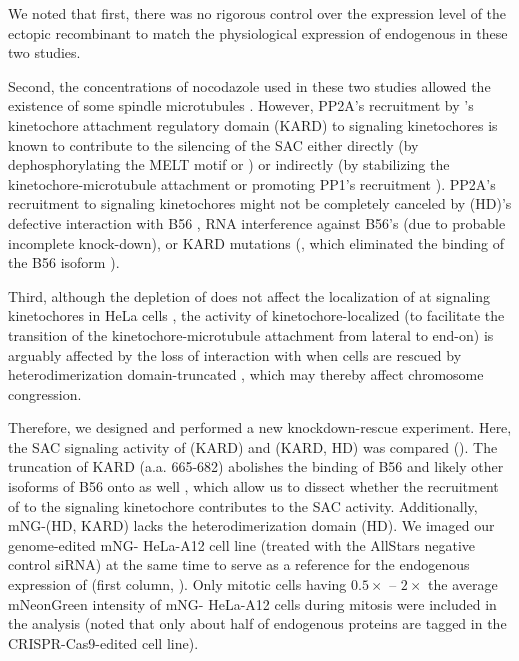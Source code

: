 We noted that first, there was no rigorous control over the expression level of the ectopic recombinant  to match the physiological expression of endogenous  in these two studies.

Second, the concentrations of nocodazole used in these two studies allowed the existence of some spindle microtubules \cite{100nMNoc}. However, PP2A's recruitment by 's kinetochore attachment regulatory domain (KARD) to signaling kinetochores is known to contribute to the silencing of the SAC either directly (by dephosphorylating the MELT motif \cite{PP2ADephosphorylatesKNL1} or  \cite{PP2ADephosphorylatesBUB1}) or indirectly (by stabilizing the kinetochore-microtubule attachment \cite{BUBR1_KT-MT, Suijkerbuijk2012, BUBR1-L669A+I672A, PP2A-B56-BUBR1ChromosomeCongression_Xu2013} or promoting PP1's recruitment \cite{PP2A-B56}). PP2A's recruitment to signaling kinetochores might not be completely canceled by (\textDelta{}HD)'s defective interaction with B56 \cite{BubBiochem}, RNA interference against B56's (due to probable incomplete knock-down), or KARD mutations (\cite{BubR1TwoPools}, which eliminated the binding of the B56\textalpha{} isoform \cite{BUBR1-L669A+I672A}).

Third, although the depletion of  does not affect the localization of  at signaling kinetochores in HeLa cells \cite{CENPELocalization-BUBR1}, the activity of kinetochore-localized  (to facilitate the transition of the kinetochore-microtubule attachment from lateral to end-on) is arguably affected by the loss of interaction with  \cite{CENPEActivity-BUBR1} when cells are rescued by heterodimerization domain-truncated , which may thereby affect chromosome congression.

Therefore, we designed and performed a new  knockdown-rescue experiment. Here, the SAC signaling activity of (\textDelta{}KARD) and (\textDelta{}KARD, \textDelta{}HD) was compared (). The truncation of KARD (a.a. 665-682) abolishes the binding of B56\textalpha{} \cite{Suijkerbuijk2012} and likely other isoforms of B56 onto  as well \cite{B56-SLiM, PP2A-B56-BUBR1Structure}, which allow us to dissect whether the recruitment of  to the signaling kinetochore  contributes to the SAC activity. Additionally, mNG-(\textDelta{}HD, \textDelta{}KARD) lacks the heterodimerization domain (HD). We imaged our genome-edited mNG- HeLa-A12 cell line (treated with the AllStars negative control siRNA) at the same time to serve as a reference for the endogenous expression of  (first column, ). Only mitotic cells having $0.5\times$ -- $2\times$ the average mNeonGreen intensity of mNG- HeLa-A12 cells during mitosis were included in the analysis (noted that only about half of endogenous  proteins are tagged in the CRISPR-Cas9-edited cell line).

